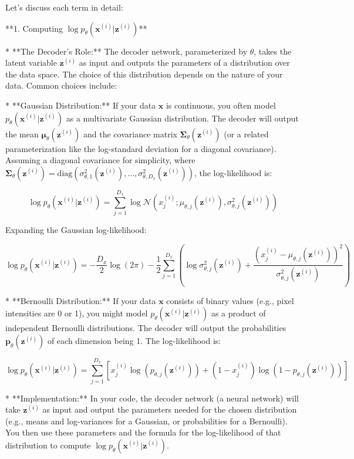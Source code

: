 \documentclass{article}
\begin{document}
Let's discuss each term in detail:

**1. Computing $\log p_{\theta}(\mathbf{x}^{(i)} | \mathbf{z}^{(i)})$**

*   **The Decoder's Role:** The decoder network, parameterized by $\theta$, takes the latent variable $\mathbf{z}^{(i)}$ as input and outputs the parameters of a distribution over the data space. The choice of this distribution depends on the nature of your data. Common choices include:

    *   **Gaussian Distribution:** If your data $\mathbf{x}$ is continuous, you often model $p_{\theta}(\mathbf{x}^{(i)} | \mathbf{z}^{(i)})$ as a multivariate Gaussian distribution. The decoder will output the mean $\bm{\mu}_{\theta}(\mathbf{z}^{(i)})$ and the covariance matrix $\mathbf{\Sigma}_{\theta}(\mathbf{z}^{(i)})$ (or a related parameterization like the log-standard deviation for a diagonal covariance). Assuming a diagonal covariance for simplicity, where $\mathbf{\Sigma}_{\theta}(\mathbf{z}^{(i)}) = \text{diag}(\sigma_{\theta,1}^2(\mathbf{z}^{(i)}), \dots, \sigma_{\theta,D_x}^2(\mathbf{z}^{(i)}))$, the log-likelihood is:

        \[
        \log p_{\theta}(\mathbf{x}^{(i)} | \mathbf{z}^{(i)}) = \sum_{j=1}^{D_x} \log \mathcal{N}(x_j^{(i)} ; \mu_{\theta,j}(\mathbf{z}^{(i)}), \sigma_{\theta,j}^2(\mathbf{z}^{(i)}))
        \]

        Expanding the Gaussian log-likelihood:

        \[
        \log p_{\theta}(\mathbf{x}^{(i)} | \mathbf{z}^{(i)}) = -\frac{D_x}{2} \log(2\pi) - \frac{1}{2} \sum_{j=1}^{D_x} \left( \log \sigma_{\theta,j}^2(\mathbf{z}^{(i)}) + \frac{(x_j^{(i)} - \mu_{\theta,j}(\mathbf{z}^{(i)}))^2}{\sigma_{\theta,j}^2(\mathbf{z}^{(i)})} \right)
        \]

    *   **Bernoulli Distribution:** If your data $\mathbf{x}$ consists of binary values (e.g., pixel intensities are 0 or 1), you might model $p_{\theta}(\mathbf{x}^{(i)} | \mathbf{z}^{(i)})$ as a product of independent Bernoulli distributions. The decoder will output the probabilities $\mathbf{p}_{\theta}(\mathbf{z}^{(i)})$ of each dimension being 1. The log-likelihood is:

        \[
        \log p_{\theta}(\mathbf{x}^{(i)} | \mathbf{z}^{(i)}) = \sum_{j=1}^{D_x} \left[ x_j^{(i)} \log(p_{\theta,j}(\mathbf{z}^{(i)})) + (1 - x_j^{(i)}) \log(1 - p_{\theta,j}(\mathbf{z}^{(i)})) \right]
        \]

*   **Implementation:** In your code, the decoder network (a neural network) will take $\mathbf{z}^{(i)}$ as input and output the parameters needed for the chosen distribution (e.g., means and log-variances for a Gaussian, or probabilities for a Bernoulli). You then use these parameters and the formula for the log-likelihood of that distribution to compute $\log p_{\theta}(\mathbf{x}^{(i)} | \mathbf{z}^{(i)})$.
\end{document}
